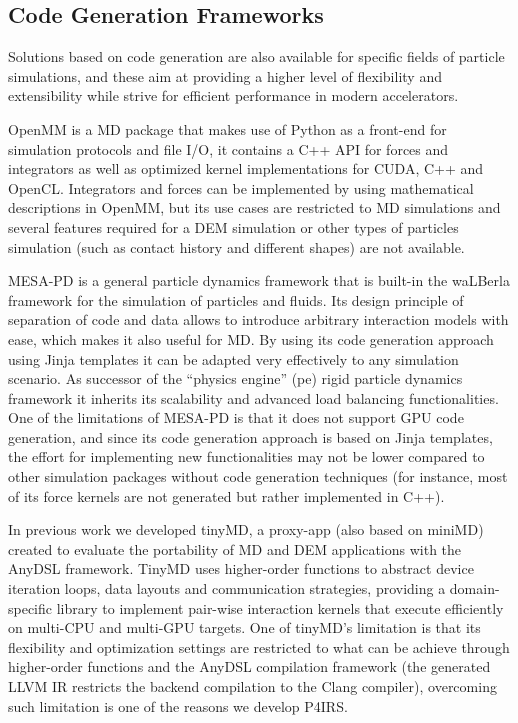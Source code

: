 \documentclass[preprint,12pt]{elsarticle}
\begin{document}
\subsection{Code Generation Frameworks}
\label{sec:codegen}


Solutions based on code generation are also available for specific fields of particle simulations, and these aim at providing a higher level of flexibility and extensibility while strive for efficient performance in modern accelerators.

OpenMM \cite{openmm} is a \ac{MD} package that makes use of Python as a front-end for simulation protocols and file I/O, it contains a C++ API for forces and integrators as well as optimized kernel implementations for CUDA, C++ and OpenCL.
Integrators and forces can be implemented by using mathematical descriptions in OpenMM, but its use cases are restricted to \ac{MD} simulations and several features required for a DEM simulation or other types of particles simulation (such as contact history and different shapes) are not available.

MESA-PD \cite{mesapd3} is a general particle dynamics framework that is built-in the waLBerla framework for the simulation of particles and fluids.
Its design principle of separation of code and data allows to introduce arbitrary interaction models with ease, which makes it also useful for \ac{MD}.
By using its code generation approach using Jinja templates it can be adapted very effectively to any simulation scenario.
As successor of the ``physics engine'' (pe) rigid particle dynamics framework it inherits its scalability and advanced load balancing functionalities.
One of the limitations of MESA-PD is that it does not support GPU code generation, and since its code generation approach is based on Jinja templates, the effort for implementing new functionalities may not be lower compared to other simulation packages without code generation techniques (for instance, most of its force kernels are not generated but rather implemented in C++).

In previous work we developed tinyMD, a proxy-app (also based on miniMD) created to evaluate the portability of MD and DEM applications with the AnyDSL \cite{anydsl1,anydsl2} framework.
TinyMD uses higher-order functions to abstract device iteration loops, data layouts and communication strategies, providing a domain-specific library to implement pair-wise interaction kernels that execute efficiently on multi-CPU and multi-GPU targets.
One of tinyMD's limitation is that its flexibility and optimization settings are restricted to what can be achieve through higher-order functions and the AnyDSL compilation framework (the generated LLVM IR restricts the backend compilation to the Clang compiler), overcoming such limitation is one of the reasons we develop P4IRS.
\end{document}
